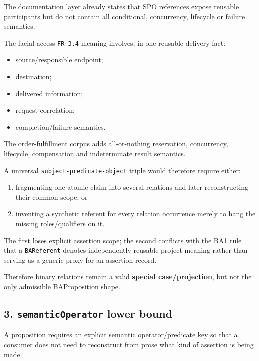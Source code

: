 \documentclass[
  10pt,
  letterpaper,
]{article}
\providecommand{\tightlist}{%
  \setlength{\itemsep}{0pt}\setlength{\parskip}{0pt}}
\begin{document}
The documentation layer already states that SPO references expose
reusable participants but do not contain all conditional, concurrency,
lifecycle or failure semantics.

The facial-access \texttt{FR-3.4} meaning involves, in one reusable
delivery fact:

\begin{itemize}
\tightlist
\item
  source/responsible endpoint;
\item
  destination;
\item
  delivered information;
\item
  request correlation;
\item
  completion/failure semantics.
\end{itemize}

The order-fulfillment corpus adds all-or-nothing reservation,
concurrency, lifecycle, compensation and indeterminate result semantics.

A universal \texttt{subject-predicate-object} triple would therefore
require either:

\begin{enumerate}
\def\labelenumi{\arabic{enumi}.}
\tightlist
\item
  fragmenting one atomic claim into several relations and later
  reconstructing their common scope; or
\item
  inventing a synthetic referent for every relation occurrence merely to
  hang the missing roles/qualifiers on it.
\end{enumerate}

The first loses explicit assertion scope; the second conflicts with the
BA1 rule that a \texttt{BAReferent} denotes independently reusable
project meaning rather than serving as a generic proxy for an assertion
record.

Therefore binary relations remain a valid \textbf{special
case/projection}, but not the only admissible BAProposition shape.

\subsection{\texorpdfstring{3. \texttt{semanticOperator} lower
bound}{3. semanticOperator lower bound}}\label{semanticoperator-lower-bound}

A proposition requires an explicit semantic operator/predicate key so
that a consumer does not need to reconstruct from prose what kind of
assertion is being made.
\end{document}
